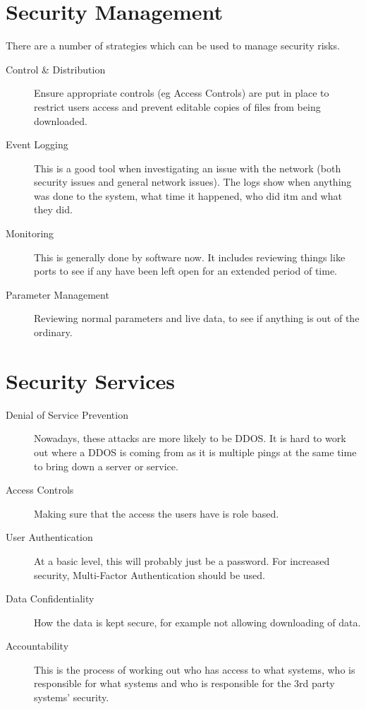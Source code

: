 \section*{Security Management}
There are a number of strategies which can be used to manage security risks.
\begin{description}
    \item[Control \& Distribution] Ensure appropriate controls (eg Access Controls) are put in place to restrict users access and prevent editable copies of files from being downloaded.
    \item[Event Logging] This is a good tool when investigating an issue with the network (both security issues and general network issues). The logs show when anything was done to the system, what time it happened, who did itm and what they did.
    \item[Monitoring] This is generally done by software now. It includes reviewing things like ports to see if any have been left open for an extended period of time. 
    \item[Parameter Management] Reviewing normal parameters and live data, to see if anything is out of the ordinary. 
\end{description}

\section*{Security Services}
\begin{description}
    \item[Denial of Service Prevention] Nowadays, these attacks are more likely to be DDOS. It is hard to work out where a DDOS is coming from as it is multiple pings at the same time to bring down a server or service.
    \item[Access Controls] Making sure that the access the users have is role based.
    \item[User Authentication] At a basic level, this will probably just be a password. For increased security, Multi-Factor Authentication should be used.
    \item[Data Confidentiality] How the data is kept secure, for example not allowing downloading of data.
    \item[Accountability] This is the process of working out who has access to what systems, who is responsible for what systems and who is responsible for the 3rd party systems' security. 
\end{description}

